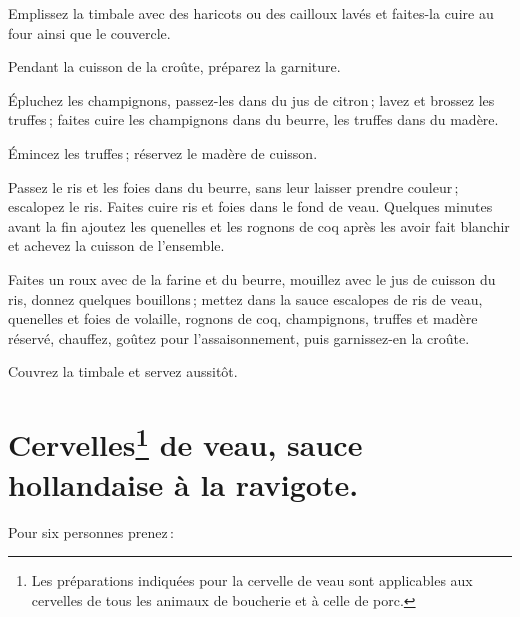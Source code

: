 Emplissez la timbale avec des haricots ou des cailloux lavés et faites-la cuire
au four ainsi que le couvercle.

Pendant la cuisson de la croûte, préparez la garniture.

Épluchez les champignons, passez-les dans du jus de citron ; lavez et brossez
les truffes ; faites cuire les champignons dans du beurre, les truffes dans du
madère.

Émincez les truffes ; réservez le madère de cuisson.

Passez le ris et les foies dans du beurre, sans leur laisser prendre couleur ;
escalopez le ris. Faites cuire ris et foies dans le fond de veau. Quelques
minutes avant la fin ajoutez les quenelles et les rognons de coq après les
avoir fait blanchir et achevez la cuisson de l’ensemble.

Faites un roux avec de la farine et du beurre, mouillez avec le jus de cuisson
du ris, donnez quelques bouillons ; mettez dans la sauce escalopes de ris de
veau, quenelles et foies de volaille, rognons de coq, champignons, truffes et
madère réservé, chauffez, goûtez pour l'assaisonnement, puis garnissez-en la
croûte.

Couvrez la timbale et servez aussitôt.

\section*{\centering Cervelles\footnote{
Les préparations indiquées pour la
cervelle de veau sont applicables aux cervelles de tous les animaux de
boucherie et à celle de porc.} de veau, sauce hollandaise à la ravigote.}
{}

Pour six personnes prenez :

\medskip

